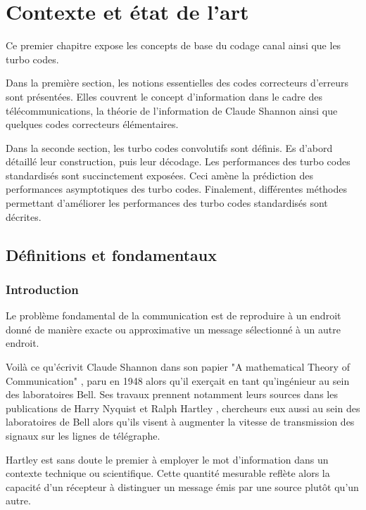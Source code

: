 
\chapter{Contexte et état de l'art}
Ce premier chapitre expose les concepts de base du codage canal ainsi que les turbo codes.

Dans la première section, les notions essentielles des codes correcteurs d'erreurs sont présentées. Elles couvrent le concept 
d'information dans le cadre des télécommunications, la théorie de l'information de Claude Shannon ainsi que
quelques codes correcteurs élémentaires.

Dans la seconde section, les turbo codes convolutifs sont définis. Es d'abord détaillé leur construction, puis leur décodage. 
Les performances des turbo codes standardisés sont succinctement exposées. Ceci amène la prédiction des performances 
asymptotiques des turbo codes. Finalement, différentes méthodes permettant d'améliorer les performances des turbo codes 
standardisés sont décrites. 

\vspace*{\fill}
\minitocTITI
\vspace*{\fill}

\section{Définitions et fondamentaux}

\subsection{Introduction}
\og Le problème fondamental de la communication est de reproduire à un endroit donné de manière exacte ou approximative 
un message sélectionné à un autre endroit.\fg

Voilà ce qu'écrivit Claude Shannon dans son papier "A mathematical Theory of Communication" \cite{shannon_mathematical_2001}, 
paru en 1948 alors qu'il exerçait en tant qu'ingénieur au sein des laboratoires Bell. Ses travaux prennent notamment 
leurs sources dans les publications de Harry Nyquist \cite{nyquist_telegraph} et Ralph Hartley \cite{hartley_trans}, 
chercheurs eux aussi au sein des laboratoires de Bell alors qu'ils visent à augmenter la vitesse de transmission des signaux sur 
les lignes de télégraphe. 

Hartley est sans doute le premier à employer le mot d'information dans un contexte technique ou scientifique. Cette 
quantité mesurable reflète alors la capacité d'un récepteur à distinguer un message émis par une 
source plutôt qu'un autre.

